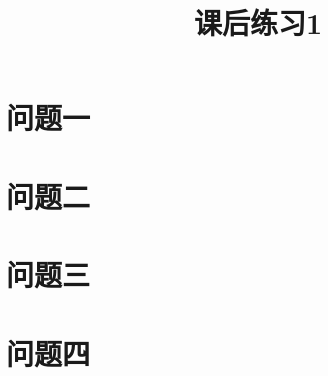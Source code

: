 \documentclass[12pt, a4paper]{article}
\title{课后练习1}
\author{}
\date{}
\begin{document}
\maketitle %

\section{问题一}



\section{问题二}


\subsection{}



\subsection{}


\subsection{}



\section{问题三}


\subsection{}



\subsection{}


\subsection{}



\section{问题四}


\subsection{}



\subsection{}


\subsection{}
\end{document}
